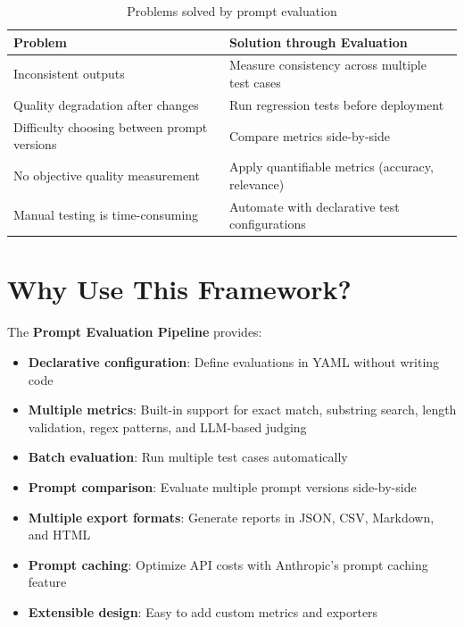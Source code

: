 \documentclass[11pt,a4paper]{report}
\begin{document}
\begin{table}[h]
\centering
\begin{tabular}{@{}p{5cm}p{8cm}@{}}
\toprule
\textbf{Problem} & \textbf{Solution through Evaluation} \\
\midrule
Inconsistent outputs & Measure consistency across multiple test cases \\
Quality degradation after changes & Run regression tests before deployment \\
Difficulty choosing between prompt versions & Compare metrics side-by-side \\
No objective quality measurement & Apply quantifiable metrics (accuracy, relevance) \\
Manual testing is time-consuming & Automate with declarative test configurations \\
\bottomrule
\end{tabular}
\caption{Problems solved by prompt evaluation}
\end{table}

\section{Why Use This Framework?}

The \textbf{Prompt Evaluation Pipeline} provides:

\begin{itemize}
    \item \textbf{Declarative configuration}: Define evaluations in YAML without writing code
    \item \textbf{Multiple metrics}: Built-in support for exact match, substring search, length validation, regex patterns, and LLM-based judging
    \item \textbf{Batch evaluation}: Run multiple test cases automatically
    \item \textbf{Prompt comparison}: Evaluate multiple prompt versions side-by-side
    \item \textbf{Multiple export formats}: Generate reports in JSON, CSV, Markdown, and HTML
    \item \textbf{Prompt caching}: Optimize API costs with Anthropic's prompt caching feature
    \item \textbf{Extensible design}: Easy to add custom metrics and exporters
\end{itemize}

\end{document}
